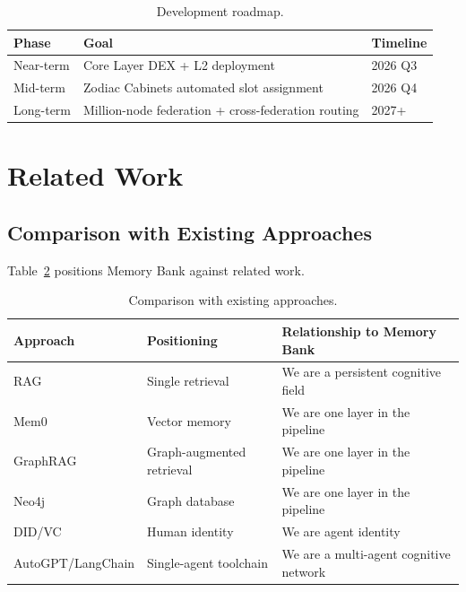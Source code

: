 \documentclass[11pt,a4paper]{article}
\begin{document}
\begin{table}[ht]
\centering
\caption{Development roadmap.}
\label{tab:roadmap}
\begin{tabular}{@{}lll@{}}
\toprule
\textbf{Phase} & \textbf{Goal} & \textbf{Timeline} \\
\midrule
Near-term & Core Layer DEX + L2 deployment            & 2026 Q3 \\
Mid-term  & Zodiac Cabinets automated slot assignment & 2026 Q4 \\
Long-term & Million-node federation + cross-federation routing & 2027+ \\
\bottomrule
\end{tabular}
\end{table}

\section{Related Work}
\label{sec:related}

\subsection{Comparison with Existing Approaches}
\label{sub:comparison}

Table~\ref{tab:related} positions Memory Bank against related work.

\begin{table}[ht]
\centering
\caption{Comparison with existing approaches.}
\label{tab:related}
\small
\begin{tabular}{@{}lll@{}}
\toprule
\textbf{Approach} & \textbf{Positioning} & \textbf{Relationship to Memory Bank} \\
\midrule
RAG~\cite{lewis2020rag}       & Single retrieval           & We are a persistent cognitive field \\
Mem0~\cite{mem02024}          & Vector memory              & We are one layer in the pipeline \\
GraphRAG~\cite{graphrag2024}  & Graph-augmented retrieval  & We are one layer in the pipeline \\
Neo4j                         & Graph database             & We are one layer in the pipeline \\
DID/VC~\cite{feder2022did}    & Human identity             & We are agent identity \\
AutoGPT/LangChain             & Single-agent toolchain     & We are a multi-agent cognitive network \\
\bottomrule
\end{tabular}
\end{table}
\end{document}
